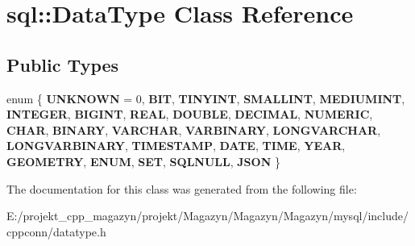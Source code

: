 \hypertarget{classsql_1_1_data_type}{}\section{sql\+:\+:Data\+Type Class Reference}
\label{classsql_1_1_data_type}
\subsection*{Public Types}
\begin{DoxyCompactItemize}
\item 
\hypertarget{classsql_1_1_data_type_ac4c908a169b4ccbb0fcef353df4dc919}{}\label{classsql_1_1_data_type_ac4c908a169b4ccbb0fcef353df4dc919} 
enum \{ \newline
{\bfseries U\+N\+K\+N\+O\+WN} = 0, 
{\bfseries B\+IT}, 
{\bfseries T\+I\+N\+Y\+I\+NT}, 
{\bfseries S\+M\+A\+L\+L\+I\+NT}, 
\newline
{\bfseries M\+E\+D\+I\+U\+M\+I\+NT}, 
{\bfseries I\+N\+T\+E\+G\+ER}, 
{\bfseries B\+I\+G\+I\+NT}, 
{\bfseries R\+E\+AL}, 
\newline
{\bfseries D\+O\+U\+B\+LE}, 
{\bfseries D\+E\+C\+I\+M\+AL}, 
{\bfseries N\+U\+M\+E\+R\+IC}, 
{\bfseries C\+H\+AR}, 
\newline
{\bfseries B\+I\+N\+A\+RY}, 
{\bfseries V\+A\+R\+C\+H\+AR}, 
{\bfseries V\+A\+R\+B\+I\+N\+A\+RY}, 
{\bfseries L\+O\+N\+G\+V\+A\+R\+C\+H\+AR}, 
\newline
{\bfseries L\+O\+N\+G\+V\+A\+R\+B\+I\+N\+A\+RY}, 
{\bfseries T\+I\+M\+E\+S\+T\+A\+MP}, 
{\bfseries D\+A\+TE}, 
{\bfseries T\+I\+ME}, 
\newline
{\bfseries Y\+E\+AR}, 
{\bfseries G\+E\+O\+M\+E\+T\+RY}, 
{\bfseries E\+N\+UM}, 
{\bfseries S\+ET}, 
\newline
{\bfseries S\+Q\+L\+N\+U\+LL}, 
{\bfseries J\+S\+ON}
 \}
\end{DoxyCompactItemize}


The documentation for this class was generated from the following file\+:\begin{DoxyCompactItemize}
\item 
E\+:/projekt\+\_\+cpp\+\_\+magazyn/projekt/\+Magazyn/\+Magazyn/\+Magazyn/mysql/include/cppconn/datatype.\+h\end{DoxyCompactItemize}
